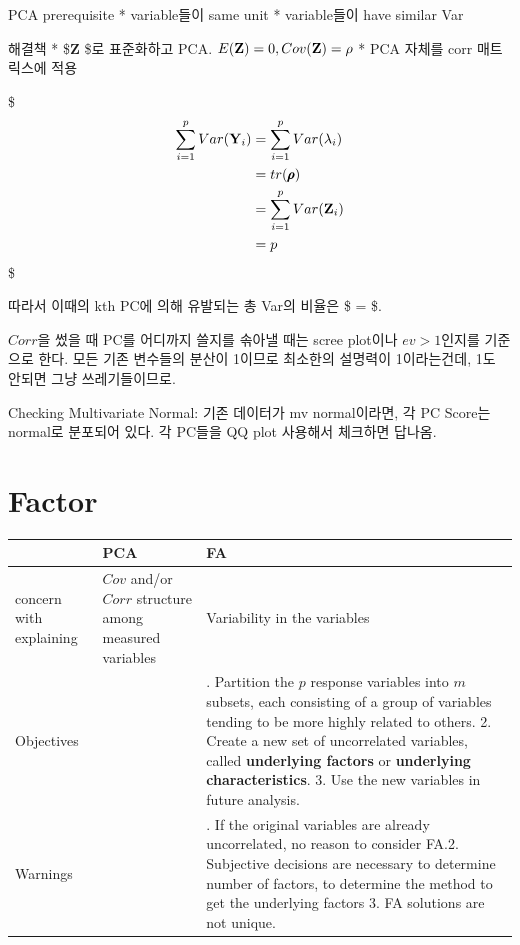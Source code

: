 \documentclass[
]{book}
\begin{document}
{{PCA prerequisite
* variable들이 same unit
* variable들이 have similar Var

해결책
* \$\textbf Z \$로 표준화하고 PCA. \(E(\textbf Z) = 0, Cov(\textbf Z )=\rho\)
* PCA 자체를 corr 매트릭스에 적용

\$
\begin{align*}

    \sum_{i=1}^p Var(\textbf Y_i) &= \sum_{i=1}^p Var(\lambda_i) \\
    &= tr(\pmb \rho) \\
    &= \sum_{i=1}^p Var(\textbf Z_i) \\
    &= p

\end{align*}
\$

따라서 이때의 kth PC에 의해 유발되는 총 Var의 비율은 \$ =  \$.

\(Corr\)을 썼을 때 PC를 어디까지 쓸지를 솎아낼 때는 scree plot이나 \(ev>1\)인지를 기준으로 한다. 모든 기존 변수들의 분산이 1이므로 최소한의 설명력이 1이라는건데, 1도 안되면 그냥 쓰레기들이므로.

Checking Multivariate Normal: 기존 데이터가 mv normal이라면, 각 PC Score는 normal로 분포되어 있다. 각 PC들을 QQ plot 사용해서 체크하면 답나옴.

\hypertarget{factor}{%
\section{Factor}\label{factor}}

\begin{longtable}[]{@{}
  >{\raggedright\arraybackslash}p{}
  >{\raggedright\arraybackslash}p{}
  >{\raggedright\arraybackslash}p{}@{}}
\toprule
& PCA & FA \\
\midrule
\endhead
concern with explaining & \(Cov\) and/or \(Corr\) structure among measured variables & Variability in the variables \\
Objectives & & 1. Partition the \(p\) response variables into \(m\) subsets, each consisting of a group of variables tending to be more highly related to others. 2. Create a new set of uncorrelated variables, called \textbf{underlying factors} or \textbf{underlying characteristics}. 3. Use the new variables in future analysis. \\
Warnings & & 1. If the original variables are already uncorrelated, no reason to consider FA.2. Subjective decisions are necessary to determine number of factors, to determine the method to get the underlying factors 3. FA solutions are not unique. \\
\bottomrule
\end{longtable}

}}
\end{document}
